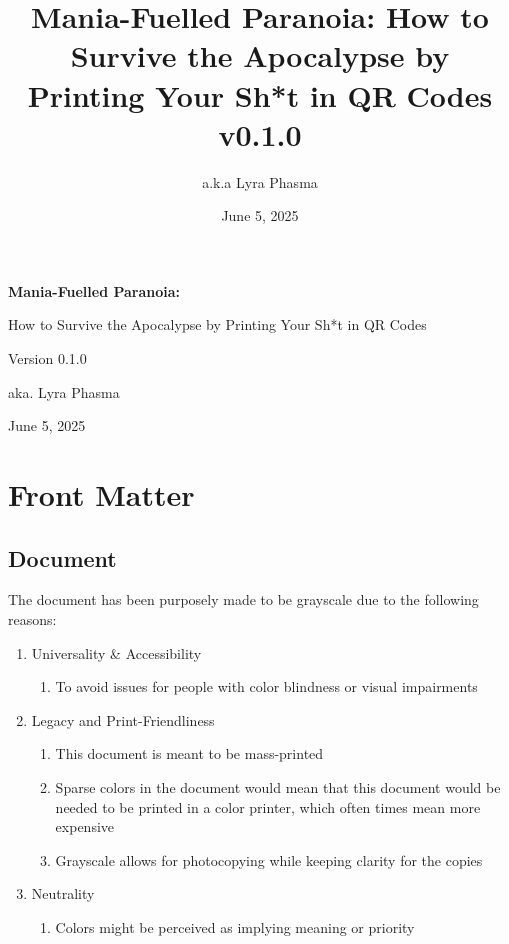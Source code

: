 \documentclass[a4paper,twoside,english]{book}
\title{Mania-Fuelled Paranoia: How to Survive the Apocalypse by Printing Your Sh*t in QR Codes v0.1.0}
\author{a.k.a Lyra Phasma}
\date{June 5, 2025}
\newcommand{\HUGETITLE}{\fontsize{4em}{5em}\selectfont\ManropeExtraBold}
\newcommand{\HUGE}{\fontsize{3em}{4em}\selectfont\ManropeExtraBold}
\begin{document}

\frontmatter

\begin{titlepage}
  \centering
  \vspace*{\fill}

  {\HUGETITLE\bfseries Mania-Fuelled Paranoia: \par}
  \vspace{0.25em}
  {\HUGE How to Survive the Apocalypse by Printing Your Sh*t in QR Codes \par}
  \vspace{1.5em}
  {\Huge Version 0.1.0\par}
  \vspace{2em}
  {\Huge aka. Lyra Phasma\par}
  \vspace{1em}
  {\Huge June 5, 2025\par}

  \vspace*{\fill}
\end{titlepage}

\tableofcontents

\mainmatter

\chapter{Front Matter}

\section{Document}

The document has been purposely made to be grayscale due to the following reasons:

\begin{enumerate}
  \item Universality \& Accessibility
    \begin{enumerate}[label=\alph*.]
      \item To avoid issues for people with color blindness or visual impairments
    \end{enumerate}
  \item Legacy and Print-Friendliness
    \begin{enumerate}[label=\alph*.]
      \item This document is meant to be mass-printed
      \item Sparse colors in the document would mean that this document would be needed to be printed in a color printer, which often times mean more expensive
      \item Grayscale allows for photocopying while keeping clarity for the copies
    \end{enumerate}
  \item Neutrality
    \begin{enumerate}[label=\alph*.]
      \item Colors might be perceived as implying meaning or priority
    \end{enumerate}
\end{enumerate}
\end{document}
